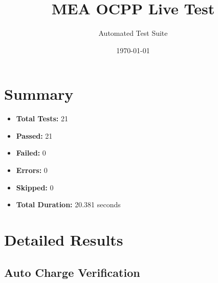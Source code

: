 \documentclass{article}
\title{MEA OCPP Live Test}
\author{Automated Test Suite}
\date{\today}
\begin{document}
\maketitle

\section{Summary}
\begin{itemize}
    \item \textbf{Total Tests:} 21
    \item \textbf{Passed:} 21
    \item \textbf{Failed:} 0
    \item \textbf{Errors:} 0
    \item \textbf{Skipped:} 0
    \item \textbf{Total Duration:} 20.381 seconds
\end{itemize}

\section{Detailed Results}
\subsection{Auto Charge Verification}
\end{document}
